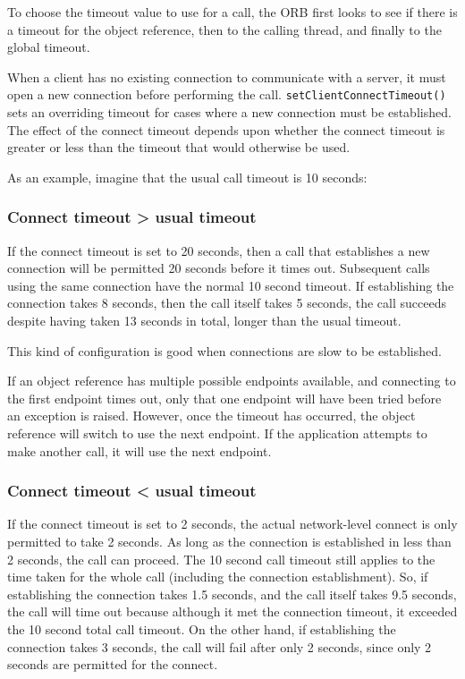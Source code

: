 \documentclass[11pt,oneside,a4paper]{book}
\newcommand{\op}[1]{\texttt{#1()}}
\newcommand{\dsc}{\discretionary{}{}{}}
\begin{document}
To choose the timeout value to use for a call, the ORB first looks to
see if there is a timeout for the object reference, then to the
calling thread, and finally to the global timeout.

When a client has no existing connection to communicate with a server,
it must open a new connection before performing the
call. \op{setClientConnect\dsc{}Timeout} sets an overriding timeout for
cases where a new connection must be established. The effect of the
connect timeout depends upon whether the connect timeout is greater
or less than the timeout that would otherwise be used.

\vspace{\baselineskip}\noindent
As an example, imagine that the usual call timeout is 10 seconds:

\subsubsection*{Connect timeout > usual timeout}

If the connect timeout is set to 20 seconds, then a call that
establishes a new connection will be permitted 20 seconds before it
times out. Subsequent calls using the same connection have the normal
10 second timeout. If establishing the connection takes 8 seconds,
then the call itself takes 5 seconds, the call succeeds despite having
taken 13 seconds in total, longer than the usual timeout.

This kind of configuration is good when connections are slow to be
established.

If an object reference has multiple possible endpoints available, and
connecting to the first endpoint times out, only that one endpoint
will have been tried before an exception is raised. However, once the
timeout has occurred, the object reference will switch to use the next
endpoint. If the application attempts to make another call, it will
use the next endpoint.


\subsubsection*{Connect timeout < usual timeout}

If the connect timeout is set to 2 seconds, the actual network-level
connect is only permitted to take 2 seconds. As long as the connection
is established in less than 2 seconds, the call can proceed. The 10
second call timeout still applies to the time taken for the whole call
(including the connection establishment). So, if establishing the
connection takes 1.5 seconds, and the call itself takes 9.5 seconds,
the call will time out because although it met the connection timeout,
it exceeded the 10 second total call timeout. On the other hand, if
establishing the connection takes 3 seconds, the call will fail after
only 2 seconds, since only 2 seconds are permitted for the connect.
\end{document}
